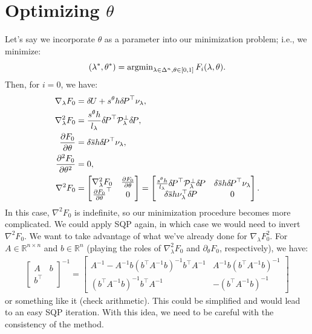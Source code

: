\documentclass[eikonal.tex]{subfiles}
\begin{document}
\section{Optimizing $\theta$}

Let's say we incorporate $\theta$ as a parameter into our minimization
problem; i.e., we minimize:
\begin{equation}
  (\lambda^*, \theta^*) = \operatorname{argmin}_{\lambda \in \Delta^n, \theta \in [0, 1]} F_i(\lambda, \theta).
\end{equation}
Then, for $i = 0$, we have:
\begin{align*}
  \nabla_\lambda F_0 &= {\delta \hspace{-0.09em} U} + s^\theta h {\delta \hspace{-0.14em} P}^\top \nu_\lambda, \\
  \nabla_\lambda^2 F_0 &= \frac{s^\theta h}{l_\lambda} {\delta \hspace{-0.14em} P}^\top \mathcal{P}_\lambda^\perp {\delta \hspace{-0.14em} P}, \\
  \frac{\partial F_0}{\partial \theta} &= \delta \overline{s} h {\delta \hspace{-0.14em} P}^\top \nu_\lambda, \\
  \frac{\partial^2 F_0}{\partial \theta^2} &= 0, \\
  \nabla^2 F_0 &= \begin{bmatrix}
    \nabla_\lambda^2 F_0 & \frac{\partial F_0}{\partial \theta} \\
    \frac{\partial F_0}{\partial \theta}^\top & 0
  \end{bmatrix} = \begin{bmatrix}
    \frac{s^\theta h}{l_\lambda} {\delta \hspace{-0.14em} P}^\top \mathcal{P}_\lambda^\perp {\delta \hspace{-0.14em} P} & \delta \overline{s} h {\delta \hspace{-0.14em} P}^\top \nu_\lambda \\
    \delta \overline{s} h \nu_\lambda^\top {\delta \hspace{-0.14em} P}  & 0
  \end{bmatrix}.
\end{align*}
In this case, $\nabla^2 F_0$ is indefinite, so our minimization
procedure becomes more complicated. We could apply SQP again, in which
case we would need to invert $\nabla^2 F_0$. We want to take advantage
of what we've already done for $\nabla_\lambda F_0^2$. For
$A \in \mathbb{R}^{n \times n}$ and $b \in \mathbb{R}^{n}$ (playing
the roles of $\nabla_\lambda^2 F_0$ and $\partial_\theta F_0$,
respectively), we have:
\begin{align*}
  \begin{bmatrix}
    A & b \\
    b^\top &
  \end{bmatrix}^{-1} = \begin{bmatrix}
    A^{-1} - A^{-1} b (b^\top A^{-1} b)^{-1} b^\top A^{-1} & A^{-1} b (b^\top A^{-1} b)^{-1} \\
    (b^\top A^{-1} b)^{-1} b^\top A^{-1} & -(b^\top A^{-1} b)^{-1}
  \end{bmatrix}
\end{align*}
or something like it (check arithmetic). This could be simplified and
would lead to an easy SQP iteration. With this idea, we need to be
careful with the consistency of the method.
\end{document}
